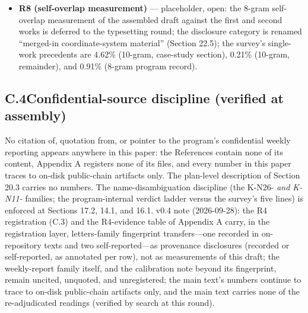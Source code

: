 \documentclass[11pt]{article}
\begin{document}
\begin{itemize}[leftmargin=1.6em,itemsep=2pt,parsep=0pt,topsep=3pt]
\item \textbf{R8 (self-overlap measurement)} — placeholder, open: the 8-gram self-overlap measurement of the assembled draft against the first and second works is deferred to the typesetting round; the disclosure category is renamed ``merged-in coordinate-system material'' (Section 22.5); the survey's single-work precedents are 4.62\% (10-gram, case-study section), 0.21\% (10-gram, remainder), and 0.91\% (8-gram program record).
\end{itemize}
\subsection*{C.4\quad Confidential-source discipline (verified at assembly)}
\noindent No citation of, quotation from, or pointer to the program's confidential weekly reporting appears anywhere in this paper: the References contain none of its content, Appendix A registers none of its files, and every number in this paper traces to on-disk public-chain artifacts only. The plan-level description of Section 20.3 carries no numbers. The name-disambiguation discipline (the K-N26-\emph{ and K-N11-} families; the program-internal verdict ladder versus the survey's five lines) is enforced at Sections 17.2, 14.1, and 16.1. v0.4 note (2026-09-28): the R4 registration (C.3) and the R4-evidence table of Appendix A carry, in the registration layer, letters-family fingerprint transfers—one recorded in on-repository texts and two self-reported—as provenance disclosures (recorded or self-reported, as annotated per row), not as measurements of this draft; the weekly-report family itself, and the calibration note beyond its fingerprint, remain uncited, unquoted, and unregistered; the main text's numbers continue to trace to on-disk public-chain artifacts only, and the main text carries none of the re-adjudicated readings (verified by search at this round).\par
\end{document}
